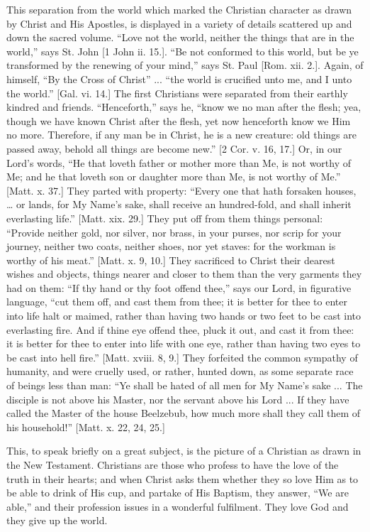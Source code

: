 This separation from the world which marked the Christian character
as drawn by Christ and His Apostles, is displayed in a variety of
details scattered up and down the sacred volume. ``Love not the
world, neither the things that are in the world,'' says St. John
[1 John ii. 15.]. ``Be not conformed to this world, but be ye
transformed by the renewing of your mind,'' says St. Paul [Rom.
xii. 2.]. Again, of himself, ``By the Cross of Christ'' ...
``the world is crucified unto me, and I unto the world.''
[Gal. vi. 14.] The first Christians were separated from their earthly
kindred and friends. ``Henceforth,'' says he, ``know we no
man after the flesh; yea, though we have known Christ after the flesh,
yet now henceforth know we Him no more. Therefore, if any man be in
Christ, he is a new creature: old things are passed away, behold all
things are become new.'' [2 Cor. v. 16, 17.] Or, in our Lord's
words, ``He that loveth father or mother more than Me, is not
worthy of Me; and he that loveth son or daughter more than Me, is not
worthy of Me.'' [Matt. x. 37.] They parted with property:
``Every one that hath forsaken houses, … or lands, for My Name's
sake, shall receive an hundred-fold, and shall inherit everlasting
life.'' [Matt. xix. 29.] They put off from them things personal:
``Provide neither gold, nor silver, nor brass, in your purses, nor
scrip for your journey, neither two coats, neither shoes, nor yet
staves: for the workman is worthy of his meat.'' [Matt. x. 9, 10.]
They sacrificed to Christ their dearest wishes and objects, things
nearer and closer to them than the very garments they had on them:
``If thy hand or thy foot offend thee,'' says our Lord, in
figurative language, ``cut them off, and cast them from thee; it
is better for thee to enter into life halt or maimed, rather than
having two hands or two feet to be cast into everlasting fire. And if
thine eye offend thee, pluck it out, and cast it from thee: it is
better for thee to enter into life with one eye, rather than having
two eyes to be cast into hell fire.'' [Matt. xviii. 8, 9.] They
forfeited the common sympathy of humanity, and were cruelly used, or
rather, hunted down, as some separate race of beings less than man:
``Ye shall be hated of all men for My Name's sake ... The disciple
is not above his Master, nor the servant above his Lord ... If they
have called the Master of the house Beelzebub, how much more shall
they call them of his household!'' [Matt. x. 22, 24, 25.]

This, to speak briefly on a great subject, is the picture of a
Christian as drawn in the New Testament. Christians are those who
profess to have the love of the truth in their hearts; and when Christ
asks them whether they so love Him as to be able to drink of His cup,
and partake of His Baptism, they answer, ``We are able,'' and
their profession issues in a wonderful fulfilment. They love God and
they give up the world.

